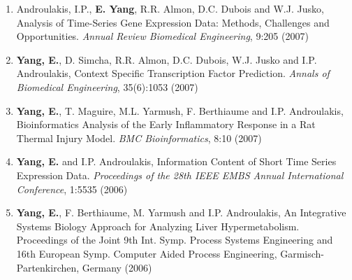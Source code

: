 \documentclass[letterpaper,9pt]{article}
\begin{document}
\begin{enumerate}
\item{{\small Androulakis, I.P., \textbf{E. Yang}, R.R. Almon, D.C. Dubois and W.J. Jusko, Analysis of Time-Series Gene Expression Data: Methods, Challenges and Opportunities. \emph{Annual Review Biomedical Engineering}, 9:205 (2007)}}
\item{{\small\textbf{Yang, E.}, D. Simcha, R.R. Almon, D.C. Dubois, W.J. Jusko and I.P. Androulakis, Context Specific Transcription Factor Prediction. \emph{Annals of Biomedical Engineering}, 35(6):1053 (2007)}}
\item{{\small \textbf{Yang, E.}, T. Maguire, M.L. Yarmush, F. Berthiaume and I.P. Androulakis, Bioinformatics Analysis of the Early Inflammatory Response in a Rat Thermal Injury Model. \emph{BMC Bioinformatics}, 8:10 (2007) }}
\item{{\small \textbf{Yang, E.} and I.P. Androulakis, Information Content of Short Time Series Expression Data. \emph{Proceedings of the 28th IEEE EMBS Annual International Conference}, 1:5535 (2006)}}
\item{{\small \textbf{Yang, E.}, F. Berthiaume, M. Yarmush and I.P. Androulakis, An Integrative Systems Biology Approach for Analyzing Liver Hypermetabolism. Proceedings of the Joint 9th  Int. Symp. Process Systems Engineering and 16th  European Symp. Computer Aided Process Engineering, Garmisch-Partenkirchen, Germany (2006)}}
\end{enumerate}
\end{document}
